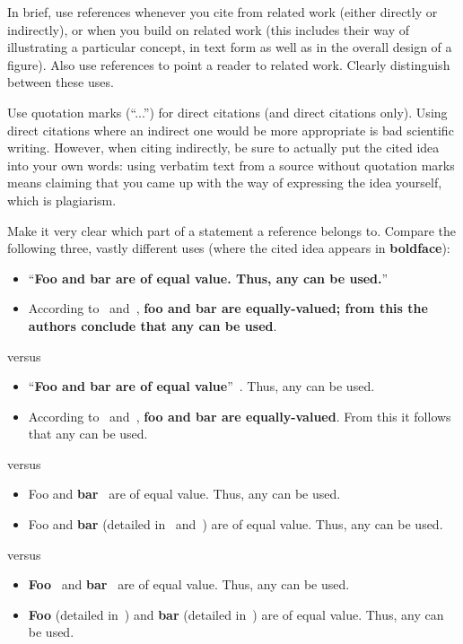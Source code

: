 In brief, use references whenever you cite from related work (either directly or indirectly), or when you build on related work (this includes their way of illustrating a particular concept, in text form as well as in the overall design of a figure).
Also use references to point a reader to related work.
Clearly distinguish between these uses.

Use quotation marks (\enquote{...}) for direct citations (and direct citations only).
Using direct citations where an indirect one would be more appropriate is bad scientific writing.
However, when citing indirectly, be sure to actually put the cited idea into your own words: using verbatim text from a source without quotation marks means claiming that you came up with the way of expressing the idea yourself, which is plagiarism.

Make it very clear which part of a statement a reference belongs to.
Compare the following three, vastly different uses (where the cited idea appears in \textbf{boldface}):

\begin{itemize}
\item \enquote{\textbf{Foo and bar are of equal value.
Thus, any can be used.}}~\cite{knuth1984complexity,berry2011apparent}
\item According to~\cite{knuth1984complexity} and~\cite{berry2011apparent}, \textbf{foo and bar are equally-valued; from this the authors conclude that any can be used}.
\end{itemize}
versus
\begin{itemize}
\item \enquote{\textbf{Foo and bar are of equal value}}~\cite{knuth1984complexity,berry2011apparent}.
Thus, any can be used.
\item According to~\cite{knuth1984complexity} and~\cite{berry2011apparent}, \textbf{foo and bar are equally-valued}.
From this it follows that any can be used.
\end{itemize}
versus
\begin{itemize}
\item Foo and \textbf{bar}~\cite{knuth1984complexity,berry2011apparent} are of equal value.
Thus, any can be used.
\item Foo and \textbf{bar} (detailed in~\cite{knuth1984complexity} and~\cite{berry2011apparent}) are of equal value.
Thus, any can be used.
\end{itemize}
versus
\begin{itemize}
\item \textbf{Foo}~\cite{knuth1984complexity} and \textbf{bar}~\cite{berry2011apparent} are of equal value.
Thus, any can be used.
\item \textbf{Foo} (detailed in~\cite{knuth1984complexity}) and \textbf{bar} (detailed in~\cite{berry2011apparent}) are of equal value.
Thus, any can be used.
\end{itemize}

